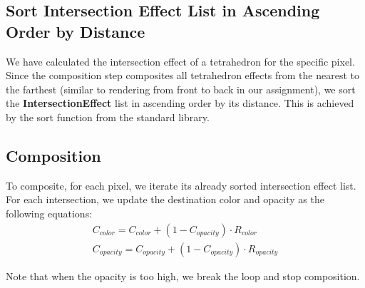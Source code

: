 \documentclass[acmtog]{acmart}
\begin{document}
\subsection{Sort Intersection Effect List in Ascending Order by Distance}
We have calculated the intersection effect of a tetrahedron for the specific pixel. Since the composition step composites all tetrahedron effects from the nearest to the farthest (similar to rendering from front to back in our assignment), we sort the \textbf{IntersectionEffect} list in ascending order by its distance. This is achieved by the sort function from the standard library.

\subsection{Composition}
To composite, for each pixel, we iterate its already sorted intersection effect list.
For each intersection, we update the destination color and opacity as the following equations:
\begin{gather} 
C_{color} = C_{color} + (1 - C_{opacity}) \cdot R_{color}\\
C_{opacity} = C_{opacity} + (1 - C_{opacity}) \cdot R_{opacity}
\end{gather}

Note that when the opacity is too high, we break the loop and stop composition.
\end{document}
